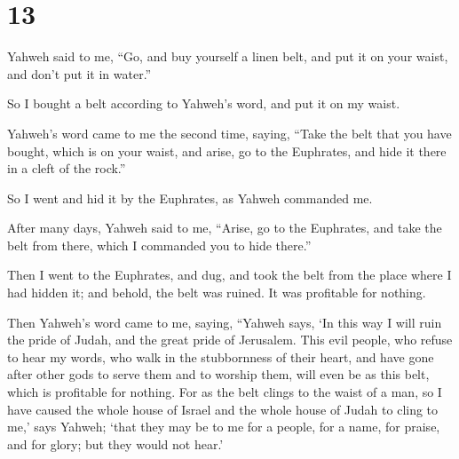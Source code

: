 \hypertarget{section-12}{%
\section{13}\label{section-12}}

 Yahweh said to me, ``Go, and buy yourself a linen belt,
and put it on your waist, and don't put it in water.''

 So I bought a belt according to Yahweh's word, and put it
on my waist.

 Yahweh's word came to me the second time, saying,
 ``Take the belt that you have bought, which is on your
waist, and arise, go to the Euphrates, and hide it there in a cleft of
the rock.''

 So I went and hid it by the Euphrates, as Yahweh
commanded me.

 After many days, Yahweh said to me, ``Arise, go to the
Euphrates, and take the belt from there, which I commanded you to hide
there.''

 Then I went to the Euphrates, and dug, and took the belt
from the place where I had hidden it; and behold, the belt was ruined.
It was profitable for nothing.

 Then Yahweh's word came to me, saying, 
``Yahweh says, `In this way I will ruin the pride of Judah, and the
great pride of Jerusalem.  This evil people, who refuse
to hear my words, who walk in the stubbornness of their heart, and have
gone after other gods to serve them and to worship them, will even be as
this belt, which is profitable for nothing.  For as the
belt clings to the waist of a man, so I have caused the whole house of
Israel and the whole house of Judah to cling to me,' says Yahweh; `that
they may be to me for a people, for a name, for praise, and for glory;
but they would not hear.'

